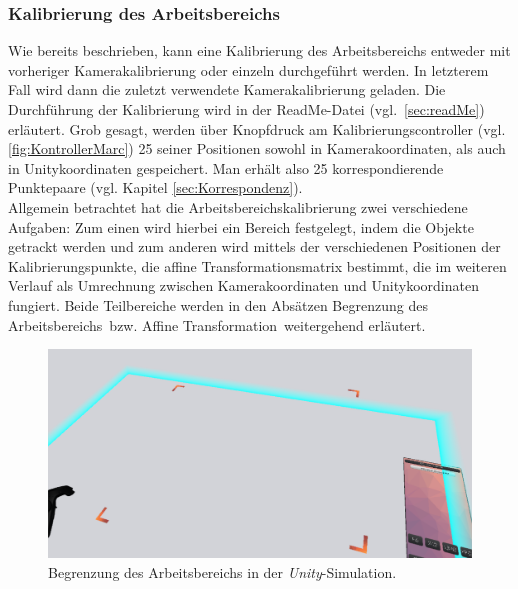 \subsubsection{Kalibrierung des Arbeitsbereichs}\label{sec:planeCalib} 
Wie bereits beschrieben, kann eine Kalibrierung des Arbeitsbereichs entweder mit vorheriger Kamerakalibrierung oder einzeln durchgeführt werden. In letzterem Fall wird dann die zuletzt verwendete Kamerakalibrierung geladen. Die Durchführung der Kalibrierung wird in der ReadMe-Datei (vgl.~\ref{sec:readMe}) erläutert. Grob gesagt, werden über Knopfdruck am Kalibrierungscontroller (vgl. \ref{fig:KontrollerMarc}) 25 seiner Positionen sowohl in Kamerakoordinaten, als auch in Unitykoordinaten gespeichert. Man erhält also 25 korrespondierende Punktepaare (vgl. Kapitel \ref{sec:Korrespondenz}).\\
Allgemein betrachtet hat die Arbeitsbereichskalibrierung zwei verschiedene Aufgaben: Zum einen wird hierbei ein Bereich festgelegt, indem die Objekte getrackt werden und zum anderen wird mittels der verschiedenen Positionen der Kalibrierungspunkte, die affine Transformationsmatrix bestimmt, die im weiteren Verlauf als Umrechnung zwischen Kamerakoordinaten und Unitykoordinaten fungiert. Beide Teilbereiche werden in den Absätzen \grqq Begrenzung des Arbeitsbereichs\grqq ~bzw. \grqq Affine Transformation\grqq ~weitergehend erläutert.

\begin{figure}
	\centering
	\includegraphics[width=\textwidth]{Bilder/Arbeitsbereich.png}
	\caption{Begrenzung des Arbeitsbereichs in der \emph{Unity}-Simulation.}
	\label{fig:begrenzungArbeitsbereich}
\end{figure}


